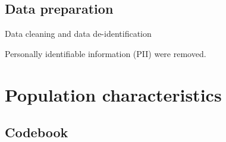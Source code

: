 \documentclass[
  letterpaper,
  DIV=11,
  numbers=noendperiod]{scrreprt}
\begin{document}
\hypertarget{data-preparation}{%
\subsection{Data preparation}\label{data-preparation}}

Data cleaning and data de-identification

Personally identifiable information (PII) were removed.

\hypertarget{population-characteristics}{%
\section{Population characteristics}\label{population-characteristics}}

\hypertarget{codebook}{%
\subsection{Codebook}\label{codebook}}
\end{document}
